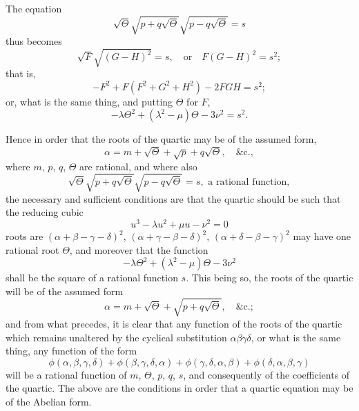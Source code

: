\documentclass[11pt,a4paper]{article}
\theoremstyle{plain}
\begin{document}
The equation
\[
\sqrt{\Theta}\sqrt{p+q\sqrt{\Theta}}\sqrt{p-q\sqrt{\Theta}} = s
\]
thus becomes
\[
\sqrt{F}\sqrt{(G-H)^2} = s, \quad \text{or} \quad F(G-H)^2 = s^2;
\]
that is,
\[
-F^2 + F(F^2+G^2+H^2) - 2FGH = s^2;
\]
or, what is the same thing, and putting $\Theta$ for $F$,
\[
-\lambda\Theta^2 + (\lambda^2 - \mu)\Theta - 3\nu^2 = s^2.
\]

\newpage
Hence in order that the roots of the quartic may be of the assumed form,
\[
\alpha = m + \sqrt{\Theta} + \sqrt{p} + q\sqrt{\Theta}, \quad \&\text{c.},
\]
where $m$, $p$, $q$, $\Theta$ are rational, and where also
\[
\sqrt{\Theta}\sqrt{p+q\sqrt{\Theta}}\sqrt{p-q\sqrt{\Theta}} = s, \text{ a rational function},
\]
the necessary and sufficient conditions are that the quartic should be such that the reducing cubic
\[
u^3 - \lambda u^2 + \mu u - \nu^2 = 0
\]
roots are $(\alpha + \beta - \gamma - \delta)^2$, $(\alpha + \gamma - \beta - \delta)^2$, $(\alpha + \delta - \beta - \gamma)^2$ may have one rational root $\Theta$, and moreover that the function
\[
-\lambda\Theta^2 + (\lambda^2 - \mu)\Theta - 3\nu^2
\]
shall be the square of a rational function $s$. This being so, the roots of the quartic will be of the assumed form
\[
\alpha = m + \sqrt{\Theta} + \sqrt{p+q\sqrt{\Theta}}, \quad \&\text{c.};
\]
and from what precedes, it is clear that any function of the roots of the quartic which remains unaltered by the cyclical substitution $\alpha\beta\gamma\delta$, or what is the same thing, any function of the form
\[
\phi(\alpha, \beta, \gamma, \delta) + \phi(\beta, \gamma, \delta, \alpha) + \phi(\gamma, \delta, \alpha, \beta) + \phi(\delta, \alpha, \beta, \gamma)
\]
will be a rational function of $m$, $\Theta$, $p$, $q$, $s$, and consequently of the coefficients of the quartic. The above are the conditions in order that a quartic equation may be of the Abelian form.
\end{document}
